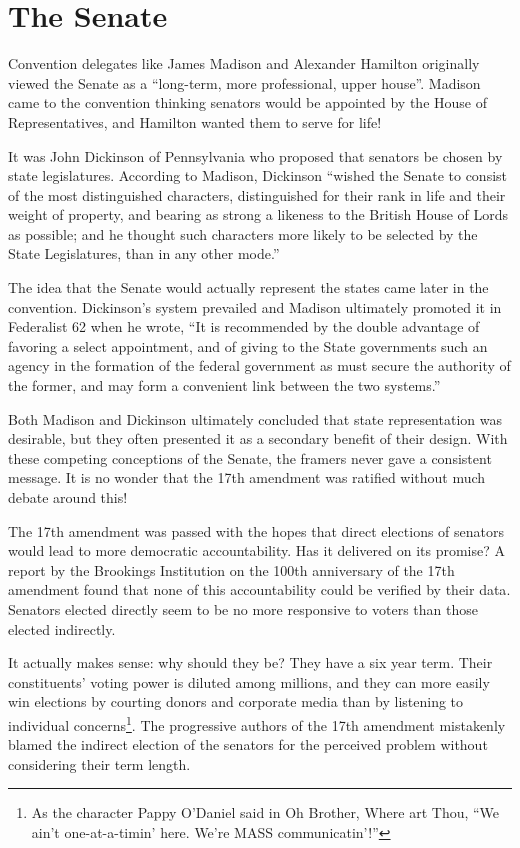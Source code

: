 \documentclass{article}
\newcommand{\quotes}[1]{``#1''}
\begin{document}
\section{The Senate}
\label{section:Senate}

Convention delegates like James Madison and Alexander Hamilton originally viewed the Senate as a \quotes{long-term, more professional, upper house}. Madison came to the convention thinking senators would be appointed by the House of Representatives, and Hamilton wanted them to serve for life!

It was John Dickinson of Pennsylvania who proposed that senators be chosen by state legislatures. According to Madison, Dickinson \quotes{wished the Senate to consist of the most distinguished characters, distinguished for their rank in life and their weight of property, and bearing as strong a likeness to the British House of Lords as possible; and he thought such characters more likely to be selected by the State Legislatures, than in any other mode.}\cite{Madison}

The idea that the Senate would actually represent the states came later in the convention. Dickinson's system prevailed and Madison ultimately promoted it in Federalist 62 when he wrote, \quotes{It is recommended by the double advantage of favoring a select appointment, and of giving to the State governments such an agency in the formation of the federal government as must secure the authority of the former, and may form a convenient link between the two systems.}\cite{Federalist62}

Both Madison and Dickinson ultimately concluded that state representation was desirable, but they often presented it as a secondary benefit of their design. With these competing conceptions of the Senate, the framers never gave a consistent message. It is no wonder that the 17th amendment was ratified without much debate around this!

The 17th amendment was passed with the hopes that direct elections of senators would lead to more democratic accountability\cite{Eisinger}. Has it delivered on its promise? A report by the Brookings Institution on the 100th anniversary of the 17th amendment found that none of this accountability could be verified by their data\cite{Schiller}. Senators elected directly seem to be no more responsive to voters than those elected indirectly.

It actually makes sense: why should they be? They have a six year term. Their constituents' voting power is diluted among millions, and they can more easily win elections by courting donors and corporate media than by listening to individual concerns\footnote{As the character Pappy O'Daniel said in Oh Brother, Where art Thou, \quotes{We ain't one-at-a-timin' here. We're MASS communicatin'!}}. The progressive authors of the 17th amendment mistakenly blamed the indirect election of the senators for the perceived problem without considering their term length.
\end{document}
